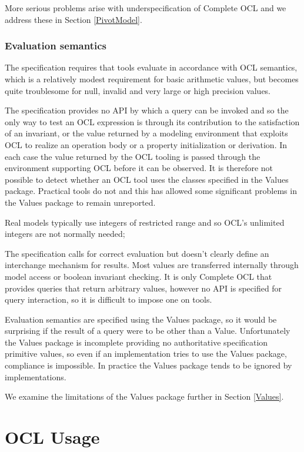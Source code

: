 \documentclass{eceasst}
\begin{document}
More serious problems arise with underspecification of Complete OCL and we address these in Section \ref{PivotModel}.

\subsubsection{Evaluation semantics}

The specification requires that tools evaluate in accordance with OCL semantics, which is a relatively modest requirement for basic arithmetic values, but becomes quite troublesome for null, invalid and very large or high precision values.

The specification provides no API by which a query can be invoked and so the only way to test an OCL expression is through its contribution to the satisfaction of an invariant, or the value returned by a modeling environment that exploits OCL to realize an operation body or a property initialization or derivation. In each case the value returned by the OCL tooling is passed through the environment supporting OCL before it can be observed. It is therefore not possible to detect whether an OCL tool uses the classes specified in the Values package. Practical tools do not and this has allowed some significant problems in the Values package to remain unreported. 


Real models typically use integers of restricted range and so OCL's unlimited integers are not normally needed; 

The specification calls for correct evaluation but doesn't clearly define an interchange mechanism for results. Most values are transferred internally through model access or boolean invariant checking. It is only Complete OCL that provides queries that return arbitrary values, however no API is specified for query interaction, so it is difficult to impose one on tools.

Evaluation semantics are specified using the Values package, so it would be surprising if the result of a query were to be other than a Value. Unfortunately the Values package is incomplete providing no authoritative specification primitive values, so even if an implementation tries to use the Values package, compliance is impossible. In practice the Values package tends to be ignored by implementations.

We examine the limitations of the Values package further in Section \ref{Values}.
 
\section{OCL Usage}\label{Usage}
\end{document}
